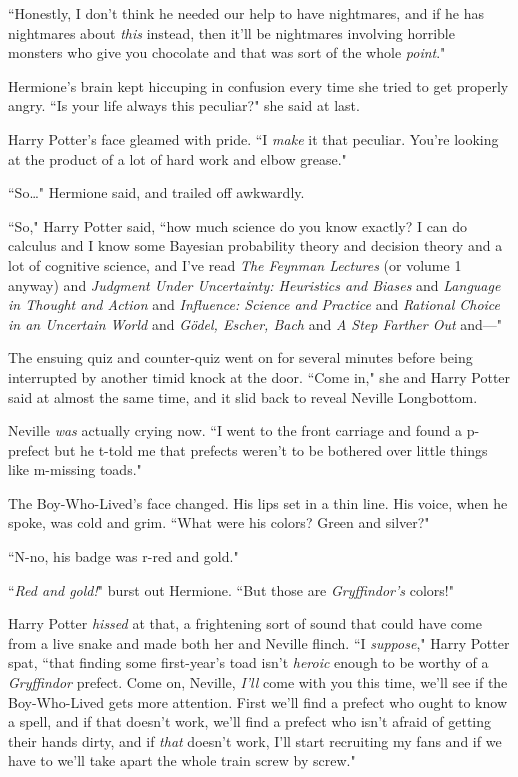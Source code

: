 ``Honestly, I don't think he needed our help to have nightmares, and if he has nightmares about \emph{this} instead, then it'll be nightmares involving horrible monsters who give you chocolate and that was sort of the whole \emph{point}."

Hermione's brain kept hiccuping in confusion every time she tried to get properly angry. ``Is your life always this peculiar?" she said at last.

Harry Potter's face gleamed with pride. ``I \emph{make} it that peculiar. You're looking at the product of a lot of hard work and elbow grease."

``So{\ldots}" Hermione said, and trailed off awkwardly.

``So," Harry Potter said, ``how much science do you know exactly? I can do calculus and I know some Bayesian probability theory and decision theory and a lot of cognitive science, and I've read \emph{The Feynman Lectures} (or volume 1 anyway) and \emph{Judgment Under Uncertainty: Heuristics and Biases} and \emph{Language in Thought and Action} and \emph{Influence: Science and Practice} and \emph{Rational Choice in an Uncertain World} and \emph{Gödel, Escher, Bach} and \emph{A Step Farther Out} and—"

The ensuing quiz and counter-quiz went on for several minutes before being interrupted by another timid knock at the door. ``Come in," she and Harry Potter said at almost the same time, and it slid back to reveal Neville Longbottom.

Neville \emph{was} actually crying now. ``I went to the front carriage and found a p-prefect but he t-told me that prefects weren't to be bothered over little things like m-missing toads."

The Boy-Who-Lived's face changed. His lips set in a thin line. His voice, when he spoke, was cold and grim. ``What were his colors? Green and silver?"

``N-no, his badge was r-red and gold."

``\emph{Red and gold!}" burst out Hermione. ``But those are \emph{Gryffindor's} colors!"

Harry Potter \emph{hissed} at that, a frightening sort of sound that could have come from a live snake and made both her and Neville flinch. ``I \emph{suppose}," Harry Potter spat, ``that finding some first-year's toad isn't \emph{heroic} enough to be worthy of a \emph{Gryffindor} prefect. Come on, Neville, \emph{I'll} come with you this time, we'll see if the Boy-Who-Lived gets more attention. First we'll find a prefect who ought to know a spell, and if that doesn't work, we'll find a prefect who isn't afraid of getting their hands dirty, and if \emph{that} doesn't work, I'll start recruiting my fans and if we have to we'll take apart the whole train screw by screw."

